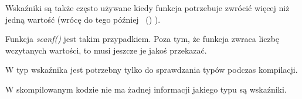 Wskaźniki są także często używane kiedy funkcja potrzebuje zwrócić więcej niż jedną wartość (wrócę do tego później
~()
).

Funkcja \emph{scanf()} jest takim przypadkiem. Poza tym, że funkcja \scanf zwraca liczbę wczytanych wartości, to musi jeszcze je jakoś przekazać.

W \CCpp typ wskaźnika jest potrzebny tylko do sprawdzania typów podczas kompilacji.

W skompilowanym kodzie nie ma żadnej informacji jakiego typu są wskaźniki.





